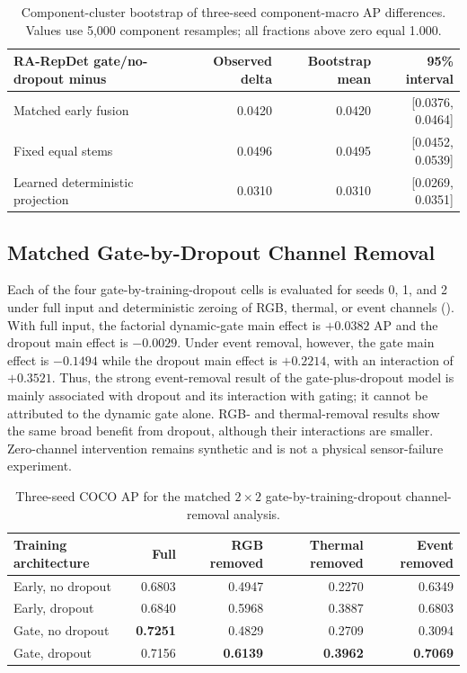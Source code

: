 \begin{table}[t]
\centering
\caption{Component-cluster bootstrap of three-seed component-macro AP differences. Values use 5,000 component resamples; all fractions above zero equal 1.000.}
\label{tab:bootstrap}
\small
\begin{tabular}{@{}lrrr@{}}
\toprule
RA-RepDet gate/no-dropout minus & Observed delta & Bootstrap mean & 95\% interval\\
\midrule
Matched early fusion & 0.0420 & 0.0420 & [0.0376, 0.0464]\\
Fixed equal stems & 0.0496 & 0.0495 & [0.0452, 0.0539]\\
Learned deterministic projection & 0.0310 & 0.0310 & [0.0269, 0.0351]\\
\bottomrule
\end{tabular}
\end{table}

\subsection{Matched Gate-by-Dropout Channel Removal}
Each of the four gate-by-training-dropout cells is evaluated for seeds 0, 1, and 2 under full input and deterministic zeroing of RGB, thermal, or event channels (). With full input, the factorial dynamic-gate main effect is $+0.0382$ AP and the dropout main effect is $-0.0029$. Under event removal, however, the gate main effect is $-0.1494$ while the dropout main effect is $+0.2214$, with an interaction of $+0.3521$. Thus, the strong event-removal result of the gate-plus-dropout model is mainly associated with dropout and its interaction with gating; it cannot be attributed to the dynamic gate alone. RGB- and thermal-removal results show the same broad benefit from dropout, although their interactions are smaller. Zero-channel intervention remains synthetic and is not a physical sensor-failure experiment.

\begin{table}[t]
\centering
\caption{Three-seed COCO AP for the matched $2\times2$ gate-by-training-dropout channel-removal analysis.}
\label{tab:removal}
\scriptsize
\begin{tabular}{@{}lrrrr@{}}
\toprule
Training architecture & Full & RGB removed & Thermal removed & Event removed\\
\midrule
Early, no dropout & 0.6803 & 0.4947 & 0.2270 & 0.6349\\
Early, dropout & 0.6840 & 0.5968 & 0.3887 & 0.6803\\
Gate, no dropout & \textbf{0.7251} & 0.4829 & 0.2709 & 0.3094\\
Gate, dropout & 0.7156 & \textbf{0.6139} & \textbf{0.3962} & \textbf{0.7069}\\
\bottomrule
\end{tabular}
\end{table}

